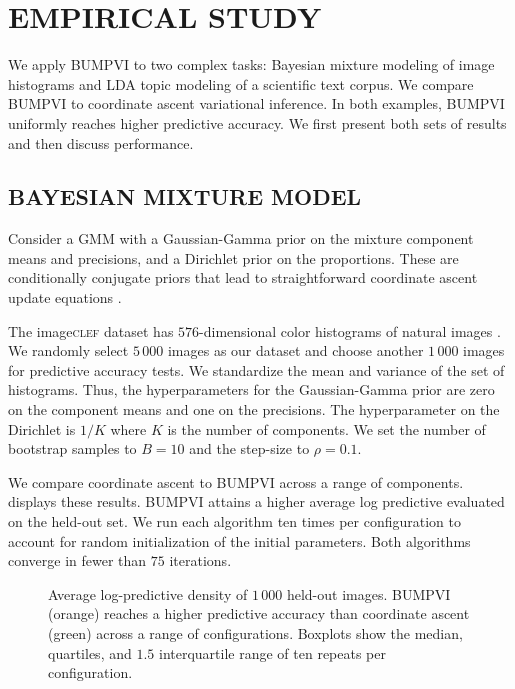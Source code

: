 
\section{EMPIRICAL STUDY}
\label{sec:empirical}

We apply \gls{BUMPVI} to two complex tasks: Bayesian mixture modeling of
image histograms and \gls{LDA} topic modeling of a scientific text corpus. We
compare \gls{BUMPVI} to coordinate
ascent variational inference. In both examples, \gls{BUMPVI} uniformly reaches
higher predictive accuracy. We first present both sets of results and then
discuss performance.

\subsection{BAYESIAN MIXTURE MODEL}

Consider a \gls{GMM} with a Gaussian-Gamma prior on the mixture component
means and precisions, and a
Dirichlet prior on the proportions. These are conditionally conjugate priors
that lead to
straightforward coordinate ascent update equations \citep{bishop2006pattern}.

The image\textsc{clef} dataset has $576$-dimensional color histograms of natural
images \citep{Villegas13_CLEF}. We randomly select $5\,000$ images as our
dataset and choose another $1\,000$ images for predictive accuracy tests. We
standardize the mean and variance of the set of histograms. Thus,
the hyperparameters for
the Gaussian-Gamma prior are zero on the component means and one on the
precisions. The hyperparameter on the Dirichlet
is $1/K$ where $K$ is the number of components.
We set the number of bootstrap samples to $B=10$ and the step-size
to $\rho = 0.1$.

We compare coordinate ascent to
\gls{BUMPVI} across a range of components.  displays these
results. \gls{BUMPVI} attains
a higher average log predictive evaluated on the held-out
set. We run each algorithm ten times per configuration to account for random initialization of the initial parameters. Both algorithms converge in
fewer than $75$ iterations.

\begin{figure}[tb]
\centering

\vspace*{-10pt}
\caption{Average log-predictive density of $1\,000$ held-out images.
\gls{BUMPVI} (\textcolor{cb_orange}{orange}) reaches a higher predictive
accuracy than coordinate ascent (\textcolor{cb_green}{green}) across a
range of configurations. Boxplots show the median, quartiles,
and $1.5$ interquartile range of ten repeats per configuration.}
\label{fig:gmm_sweep}
\end{figure}


